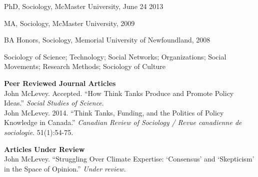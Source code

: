 \documentclass[11pt,usenames,dvipsnames]{article}
\begin{document}
\medskip 
{}

\noindent PhD, Sociology, McMaster University, June 24 2013



\noindent MA, Sociology, McMaster University, 2009

\noindent BA Honors, Sociology, Memorial University of Newfoundland, 2008 \\



\noindent Sociology of Science; Technology; Social Networks; Organizations; Social Movements; Research Methods; Sociology of Culture \\



\ind \textbf{Peer Reviewed Journal Articles} \\

\ind John McLevey. Accepted. ``How Think Tanks Produce and Promote Policy Ideas.'' \emph{Social Studies of Science}. \\

\ind John McLevey. 2014. ``Think Tanks, Funding, and the Politics of Policy Knowledge in Canada.'' \emph{Canadian Review of Sociology / Revue canadienne de sociologie}. 51(1):54-75.\\


\ind \textbf{Articles Under Review} \\

\ind John McLevey. ``Struggling Over Climate Expertise: `Consensus' and `Skepticism' in the Space of Opinion.'' \emph{Under review.}   \\ %

\end{document}
